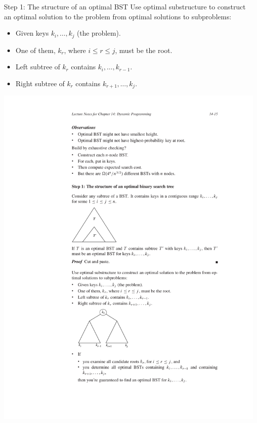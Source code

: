 \documentclass{beamer}
\begin{document}
\begin{frame}{Step 1: The structure of an optimal BST}
    Use optimal substructure to construct an optimal solution to the problem from optimal solutions to subproblems:
    \begin{itemize}
        \item Given keys $k_i, \ldots, k_j$ (the problem).
        \item One of them, $k_r$, where $i \leq r \leq j$, must be the root.
        \item Left subtree of $k_r$ contains $k_i, \ldots, k_{r-1}$.
        \item Right subtree of $k_r$ contains $k_{r+1}, \dots, k_j$.
    \end{itemize}
    \includegraphics[width=\textwidth, trim={4cm 6cm 4cm 18.25cm}, clip]{figures/BST_step1}
\end{frame}
\end{document}
